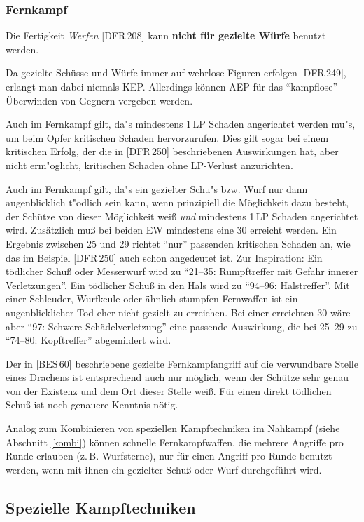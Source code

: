 \documentclass[10pt,a4paper,germanpar]{article}
\begin{document}
\subsubsection{Fernkampf}

Die Fertigkeit \emph{Werfen} [DFR\,208] kann \textbf{nicht für gezielte
  Würfe} benutzt werden.

Da gezielte Schüsse und Würfe immer auf wehrlose Figuren erfolgen
[DFR\,249], erlangt man dabei niemals KEP. Allerdings können AEP
für das "`kampflose"' Überwinden von Gegnern vergeben werden.

Auch im Fernkampf gilt, da"s mindestens 1\,LP Schaden angerichtet
werden mu"s, um beim Opfer kritischen Schaden hervorzurufen. Dies gilt
sogar bei einem kritischen Erfolg, der die in [DFR\,250] beschriebenen
Auswirkungen hat, aber nicht erm"oglicht, kritischen Schaden ohne
LP-Verlust anzurichten.

Auch im Fernkampf gilt, da"s ein gezielter Schu"s bzw. Wurf nur dann
augenblicklich t"odlich sein kann, wenn prinzipiell die Möglichkeit
dazu besteht, der Schütze von dieser Möglichkeit weiß \emph{und}
mindestens 1\,LP Schaden angerichtet wird. Zusätzlich muß bei beiden
EW mindestens eine 30 erreicht werden. Ein Ergebnis zwischen 25 und 29
richtet "`nur"' passenden kritischen Schaden an, wie das im Beispiel
[DFR\,250] auch schon angedeutet ist. Zur Inspiration: Ein tödlicher
Schuß oder Messerwurf wird zu "`21--35: Rumpftreffer mit Gefahr
innerer Verletzungen"'. Ein tödlicher Schuß in den Hals wird zu
"`94--96: Halstreffer"'. Mit einer Schleuder, Wurfkeule oder ähnlich
stumpfen Fernwaffen ist ein augenblicklicher Tod eher nicht gezielt zu
erreichen. Bei einer erreichten 30 wäre aber "`97: Schwere
Schädelverletzung"' eine passende Auswirkung, die bei 25--29 zu
"`74--80: Kopftreffer"' abgemildert wird.

Der in [BES\,60] beschriebene gezielte Fernkampfangriff auf die
verwundbare Stelle eines Drachens ist entsprechend auch nur möglich,
wenn der Schütze sehr genau von der Existenz und dem Ort dieser Stelle
weiß. Für einen direkt tödlichen Schuß ist noch genauere Kenntnis
nötig.

Analog zum Kombinieren von speziellen Kampftechniken im Nahkampf
(siehe Abschnitt \ref{kombi}) können schnelle Fernkampfwaffen, die
mehrere Angriffe pro Runde erlauben (z.\,B. Wurfsterne), nur für einen
Angriff pro Runde benutzt werden, wenn mit ihnen ein gezielter Schuß
oder Wurf durchgeführt wird.

\subsection{Spezielle Kampftechniken}
\end{document}
